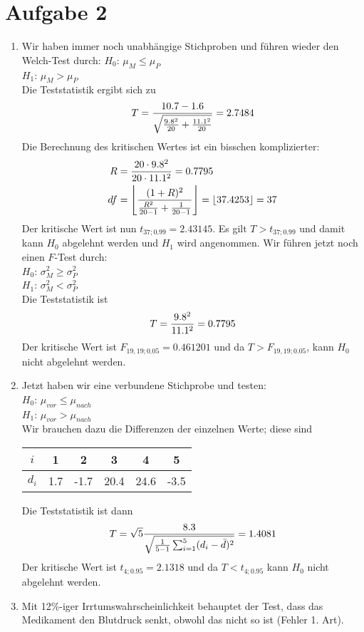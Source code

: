 \documentclass{article}
\begin{document}
	\section*{Aufgabe 2}
	\begin{enumerate}[label=(\alph*)]
		\item Wir haben immer noch unabhängige Stichproben und führen wieder den Welch-Test durch:
		$H_0$: $\mu_M \le \mu_P$ \\
		$H_1$: $\mu_M > \mu_P$ \\
		Die Teststatistik ergibt sich zu
		\begin{align}
			T = \frac{10.7-1.6}{\sqrt{\frac{9.8^2}{20} + \frac{11.1^2}{20}}} = 2.7484 \notag
		\end{align}
		Die Berechnung des kritischen Wertes ist ein bisschen komplizierter:
		\begin{align}
			R &= \frac{20\cdot 9.8^2}{20\cdot 11.1^2} = 0.7795 \notag \\
			df &= \left\lfloor\frac{(1+R)^2}{\frac{R^2}{20-1} + \frac{1}{20-1}}\right\rfloor = \lfloor 37.4253\rfloor = 37 \notag
		\end{align}
		Der kritische Wert ist nun $t_{37;0.99}=2.43145$. Es gilt $T>t_{37;0.99}$ und damit kann $H_0$ abgelehnt werden und $H_1$ wird angenommen. Wir führen jetzt noch einen $F$-Test durch: \\
		$H_0$: $\sigma_M^2 \ge \sigma_P^2$ \\
		$H_1$: $\sigma_M^2 < \sigma_P^2$ \\
		Die Teststatistik ist
		\begin{align}
			T = \frac{9.8^2}{11.1^2} = 0.7795 \notag
		\end{align}
		Der kritische Wert ist $F_{19,19;0.05}=0.461201$ und da $T>F_{19,19;0.05}$, kann $H_0$ nicht abgelehnt werden.
		\item Jetzt haben wir eine verbundene Stichprobe und testen: \\
		$H_0$: $\mu_{vor} \le \mu_{nach}$ \\
		$H_1$: $\mu_{vor} > \mu_{nach}$ \\
		Wir brauchen dazu die Differenzen der einzelnen Werte; diese sind
		\begin{center}
			\begin{tabular}{c|ccccc}
				$i$ & 1 & 2 & 3 & 4 & 5 \\
				\hline
				$d_i$ & 1.7 & -1.7 & 20.4 & 24.6 & -3.5
			\end{tabular}
		\end{center}
		Die Teststatistik ist dann
		\begin{align}
			T = \sqrt{5}\frac{8.3}{\sqrt{\frac{1}{5-1}\sum_{i=1}^{5}(d_i-\bar{d})^2}} = 1.4081 \notag
		\end{align}
		Der kritische Wert ist $t_{4;0.95}=2.1318$ und da $T< t_{4;0.95}$ kann $H_0$ nicht abgelehnt werden.
		\item Mit 12\%-iger Irrtumswahrscheinlichkeit behauptet der Test, dass das Medikament den Blutdruck senkt, obwohl das nicht so ist (Fehler 1. Art).
	\end{enumerate}
\end{document}
